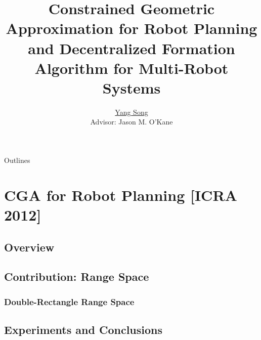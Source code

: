\documentclass[10pt]{beamer}
\title[Ph.D. Defense]{Constrained Geometric Approximation for Robot Planning and  Decentralized Formation Algorithm for Multi-Robot Systems}
\author[Yang Song]{
  \underline{Yang Song}\\
  Advisor: Jason M. O'Kane
}
\institute[
USC
] %
{ %
  Dept. of Computer Science and Engineering\\
  University of South Carolina
  
}
\begin{document}
\begin{frame}
  \titlepage
\end{frame}
\begin{frame}{Outlines}{}
\tableofcontents
\end{frame}

\section{CGA for Robot Planning [ICRA 2012]}
\subsection[Overview]{Overview}








%
%



\subsection[Range Space]{Contribution: Range Space}







\subsubsection[Algorithm1]{Double-Rectangle Range Space}








\subsection[Experiments]{Experiments and Conclusions}

% 
% 
% 
% 
% 

%
\end{document}
